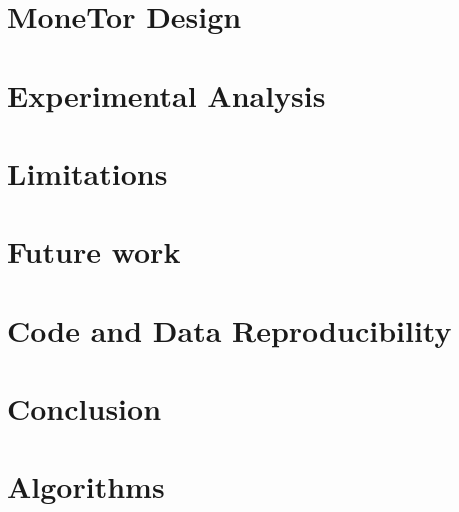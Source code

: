 \documentclass[sigconf, anonymous]{acmart}
\begin{document}
\section{MoneTor Design}
\label{sec:design}


\section{Experimental Analysis}
\label{sec:analysis}


\section{Limitations}
\label{sec:limitations}
\section{Future work}
\label{sec:future_work}

\section{Code and Data Reproducibility}
\label{sec:code}

\section{Conclusion}
\label{sec:conclusion}



\appendix

\section{Algorithms}
\label{sec:algorithms}

\end{document}
